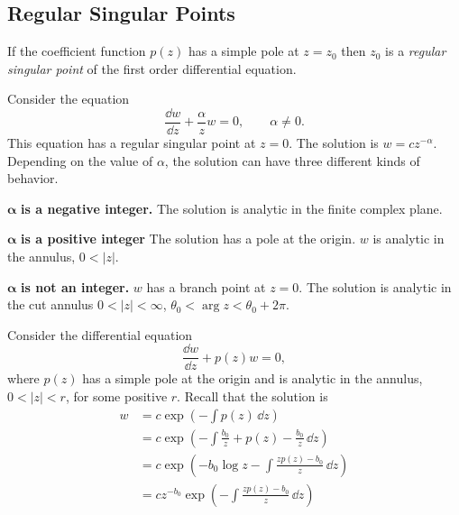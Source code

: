 \subsection{Regular Singular Points}



If the coefficient function $p(z)$ has a simple pole at $z = z_0$ then $z_0$ 
is a \textit{regular singular point} of the first order differential equation.





\begin{Example}
  Consider the equation
  \[
  \frac{\dd w}{\dd z} + \frac{\alpha}{z} w = 0, \qquad \alpha \neq 0.
  \]
  This equation has a regular singular point at $z = 0$.
  The solution is $w = c z^{-\alpha}$.  Depending on the value of $\alpha$, the
  solution can have three different kinds of behavior.

  \begin{description}
  \item{$\boldsymbol{\alpha}$ \textbf{is a negative integer.}}
    The solution is analytic in the finite complex plane.
  \item{$\boldsymbol{\alpha}$ \textbf{is a positive integer}}
    The solution has a pole at the origin.  
    $w$ is analytic in the annulus, $0<|z|$.
  \item{$\boldsymbol{\alpha}$ \textbf{is not an integer.}}
    $w$ has a branch point at $z=0$.
    The solution is analytic in the cut annulus $0 < |z| < \infty $, 
    $\theta_0 < \arg z < \theta_0 + 2 \pi$.
  \end{description}
\end{Example}




Consider the differential equation
\[ 
\frac{\dd w}{\dd z} + p(z) w = 0, 
\]
where $p(z)$ has a simple pole at the origin and is analytic in the annulus, 
$0 < |z| < r$, for some positive $r$.  Recall that the solution is
\begin{align*}
  w       &= c \exp \left(- \int p(z)\,\dd z \right) \\
  &= c \exp \left(- \int \frac{b_0}{z} + p(z) - \frac{b_0}{z} \,\dd z 
  \right) \\
  &= c \exp \left( - b_0 \log z - \int \frac{z p(z) - b_0}{z} \,\dd z 
  \right) \\
  &= c z^{-b_0} \exp \left(  - \int \frac{z p(z) - b_0}{z} \,\dd z \right)
\end{align*}

